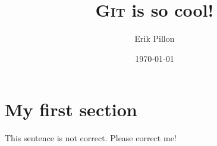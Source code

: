 \documentclass{article}
\author{Erik Pillon}
\title{\textsc{Git} is so cool!}
\date{\today}
\begin{document}
\maketitle
{}

\section{My first section}

This sentence is not correct. Please correct me!
\end{document}
